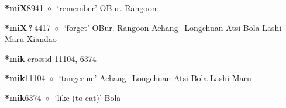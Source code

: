   \begin{list}{}{\leftmargin=1.5em \itemindent=-1.5em}
  \item {\footnotesize \textbf{*miX}}{\tiny 8941}
         $\diamond$~`remember'
         OBur. 
\hspace{1ex}
         Rangoon 
  \item {\footnotesize \textbf{*miX\,?\,}}{\tiny 4417}
\hspace{1ex}
         $\diamond$~`forget'
         OBur. 
\hspace{1ex}
         Rangoon 
\hspace{1ex}
         Achang\_Longchuan 
\hspace{1ex}
         Atsi 
\hspace{1ex}
         Bola 
\hspace{1ex}
         Lashi 
\hspace{1ex}
         Maru 
\hspace{1ex}
         Xiandao 
  \end{list}
\item
\textbf{*mik}
  {\tiny crossid 11104, 6374}
  \begin{list}{}{\leftmargin=1.5em \itemindent=-1.5em}
  \item {\footnotesize \textbf{*mik}}{\tiny 11104}
         $\diamond$~`tangerine'
         Achang\_Longchuan 
\hspace{1ex}
         Atsi 
\hspace{1ex}
         Bola 
\hspace{1ex}
         Lashi 
\hspace{1ex}
         Maru 
  \item {\footnotesize \textbf{*mik}}{\tiny 6374}
\hspace{1ex}
         $\diamond$~`like (to eat)'
         Bola 
  \end{list}
